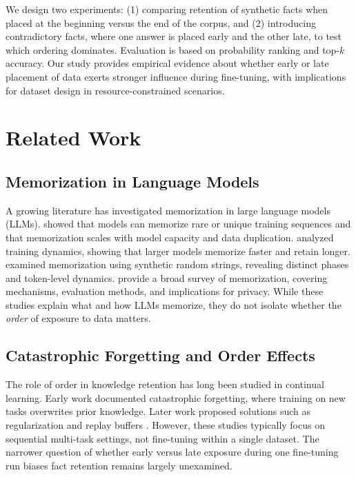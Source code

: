 \documentclass[11pt]{article}
\begin{document}
    We design two experiments: (1) comparing retention of synthetic facts when placed at the beginning versus the end of the corpus, and (2) introducing contradictory facts, where one answer is placed early and the other late, to test which ordering dominates. Evaluation is based on probability ranking and top-$k$ accuracy. Our study provides empirical evidence about whether early or late placement of data exerts stronger influence during fine-tuning, with implications for dataset design in resource-constrained scenarios.

    \section{Related Work}

    \subsection{Memorization in Language Models}
    A growing literature has investigated memorization in large language models (LLMs). \citet{carlini2023quantifying} showed that models can memorize rare or unique training sequences and that memorization scales with model capacity and data duplication. \citet{tirumala2022memorization} analyzed training dynamics, showing that larger models memorize faster and retain longer. \citet{speicher2024mechanics} examined memorization using synthetic random strings, revealing distinct phases and token-level dynamics. \citet{wei2024survey} provide a broad survey of memorization, covering mechanisms, evaluation methods, and implications for privacy. While these studies explain what and how LLMs memorize, they do not isolate whether the \emph{order} of exposure to data matters.

    \subsection{Catastrophic Forgetting and Order Effects}
    The role of order in knowledge retention has long been studied in continual learning. Early work \citep{mccloskey1989catastrophic,french1999catastrophic} documented catastrophic forgetting, where training on new tasks overwrites prior knowledge. Later work proposed solutions such as regularization and replay buffers \citep{kirkpatrick2017overcoming,lopez2017gradient}. However, these studies typically focus on sequential multi-task settings, not fine-tuning within a single dataset. The narrower question of whether early versus late exposure during one fine-tuning run biases fact retention remains largely unexamined.
\end{document}
